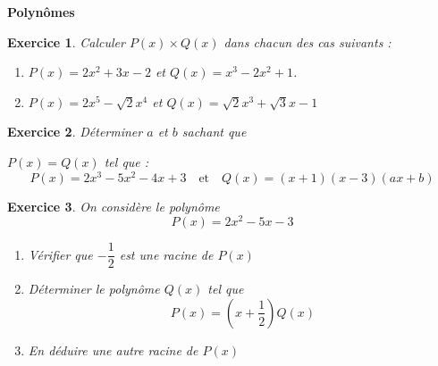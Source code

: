 \documentclass[12pt,a4paper]{article}
\theoremstyle{mystyle}
\newtheorem{exo}{Exercice}
\begin{document}
\pagestyle{fancy}
\fancyhf{} %
\fancyfoot[C]{\thepage} %


\begin{center}
    \textbf{\Large Polynômes }
\end{center}
\begin{multicols*}{2}
%

\begin{exo}
Calculer $P(x)\times Q(x)$ dans chacun des cas suivants :
\begin{enumerate}
	\item $P(x) = 2x^2 + 3x - 2$ et $Q(x) = x^3 - 2x^2 + 1$.
	\item $P(x) = 2x^5 - \sqrt{2}x^4$ et $Q(x) = \sqrt{2}x^3 + \sqrt{3}x - 1$
\end{enumerate}


\end{exo}

\begin{exo}
Déterminer \(a\) et \(b\) sachant que 

\(P(x) = Q(x)\) tel que :
\[
P(x) = 2x^3 - 5x^2 - 4x + 3 \quad \text{et} \quad Q(x) = (x + 1)(x - 3)(ax + b)
\]
\end{exo}

\begin{exo}
On considère le polynôme \[P(x) = 2x^2 - 5x - 3\]

\begin{enumerate}
    \item Vérifier que \(-\dfrac{1}{2}\) est une racine de \(P(x)\)
    \item Déterminer le polynôme \(Q(x)\) tel que \[P(x) = \left(x + \dfrac{1}{2}\right)Q(x)\]
    \item En déduire une autre racine de \(P(x)\)
\end{enumerate}
\end{exo}


\end{multicols*}
\end{document}
